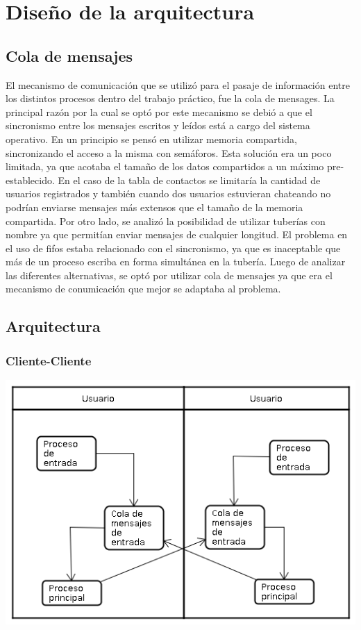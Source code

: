 \section{Diseño de la arquitectura}

\subsection{Cola de mensajes}
 
El mecanismo de comunicación que se utilizó para el pasaje de información entre
los distintos procesos dentro del trabajo práctico, fue la cola de mensages. La 
principal razón por la cual se optó por este mecanismo se debió a que el sincronismo
entre los mensajes escritos y leídos está a cargo del sistema operativo. En un 
principio se pensó en utilizar memoria compartida, sincronizando el acceso a la misma
con semáforos. Esta solución era un poco limitada, ya que acotaba el tamaño de los
datos compartidos a un máximo pre-establecido. En el caso de la tabla de contactos 
se limitaría la cantidad de usuarios registrados y también cuando dos usuarios estuvieran chateando
no podrían enviarse mensajes más extensos que el tamaño de la memoria compartida. Por
otro lado, se analizó la posibilidad de utilizar tuberías con nombre ya que permitían enviar mensajes
de cualquier longitud. El problema en el uso de fifos estaba relacionado con el sincronismo,
ya que es inaceptable que más de un proceso escriba en forma simultánea en la tubería.
Luego de analizar las diferentes alternativas, se optó por utilizar cola de mensajes
ya que era el mecanismo de conumicación que mejor se adaptaba al problema.

\subsection{Arquitectura}
\subsubsection{Cliente-Cliente}
\begin{center}
\small\includegraphics[scale=0.65]{./Images/ArquitecturaClienteConCliente}
\end{center}
